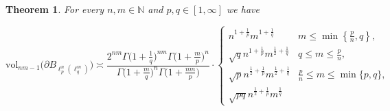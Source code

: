 \documentclass[11pt,reqno]{amsart}
\renewcommand{\le}{\leqslant}
\renewcommand{\ge}{\geqslant}
\newtheorem{theorem}{Theorem}
\theoremstyle{remark}
\newcommand{\iq}{\mathrm{iq}}
\newcommand{\N}{\mathbb N}
\newcommand{\vol}{\mathrm{vol}}
\renewcommand{\1}{\mathbf 1}
\begin{document}
\begin{theorem}\label{cor:surface area on lplq} For every $n,m\in \N$ and $p,q\in [1,\infty]$ we have

\begin{equation}
\vol_{nm-1}\big(\partial B_{\ell_p^n(\ell_q^m)}\big)\asymp\frac{2^{nm}\Gamma\big(1+\frac{1}{q}\big)^{nm}
\Gamma\big(1+\frac{m}{p}\big)^n}{\Gamma\big(1+\frac{m}{q}\big)^n\Gamma\big(1+\frac{nm}{p}\big)}\cdot\left\{\begin{array}{ll}n^{1+\frac{1}{p}}m^{1+\frac{1}{q}}& m\le \min\left\{\frac{p}{n},q\right\},\\ \sqrt{q} n^{1+\frac{1}{p}} m^{\frac12+\frac{1}{q}} & q\le m\le \frac{p}{n},\\ \sqrt{p}n^{\frac12+\frac{1}{p}}m^{\frac12+\frac{1}{q}}&\frac{p}{n}\le m\le \min\{p,q\},\\\sqrt{pq} n^{\frac12+\frac{1}{p}}m^{\frac{1}{q}}

\end{array}
\end{equation}
\end{theorem}
\end{document}
